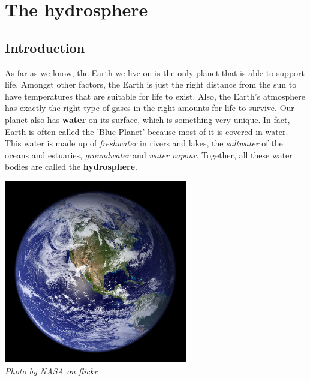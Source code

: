          \chapter{The hydrosphere}
    \setcounter{figure}{1}
    \setcounter{subfigure}{1}
    \label{m38138}
    \section{Introduction}
            \nopagebreak
\begin{minipage}{.7\textwidth}
      \label{m38138*id334056}As far as we know, the Earth we live on is the only planet that is able to support life. Amongst other factors, the Earth is just the right distance from the sun to have temperatures that are suitable for life to exist. Also, the Earth's atmosphere has exactly the right type of gases in the right amounts for life to survive. Our planet also has \textbf{water} on its surface, which is something very unique. In fact, Earth is often called the 'Blue Planet' because most of it is covered in water. This water is made up of \textsl{freshwater} in rivers and lakes, the \textsl{saltwater} of the oceans and estuaries, \textsl{groundwater} and \textsl{water vapour}. Together, all these water bodies are called the \textbf{hydrosphere}.\par 
{}
\end{minipage}
\begin{minipage}{.3\textwidth}
\begin{center}
 \includegraphics[width=0.6\textwidth]{photos/earth_space_nasa-flickr.jpg}\\
\textsl{Photo by NASA on flickr}
\end{center}

\end{minipage}

